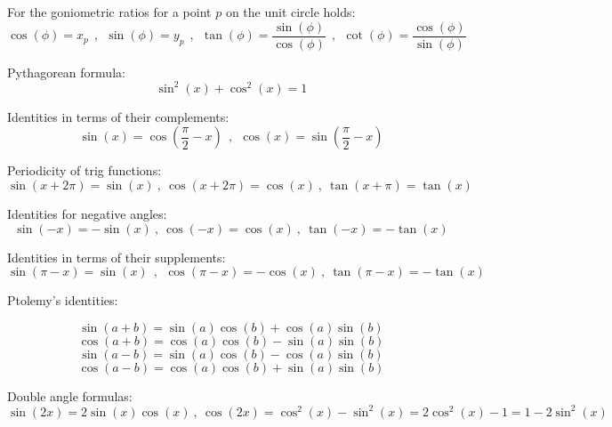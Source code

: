 For the goniometric ratios for a point $p$ on the unit circle holds:
\[
\cos(\phi)=x_p~~,~~\sin(\phi)=y_p~~,~~\tan(\phi)=\frac{\sin(\phi)}{\cos(\phi)}~~,~~\cot(\phi)=\frac{\cos(\phi)}{\sin(\phi)}
\]

Pythagorean formula:
\[
\sin^2(x)+\cos^2(x)=1 
\]

Identities in terms of their complements:
\[
\sin(x)=\cos(\frac{\pi}{2}-x) \ \ , \ \ \cos(x)=\sin(\frac{\pi}{2}-x)
\]

Periodicity of trig functions:
\[
\sin(x+2\pi)=\sin(x) \ , \ \cos(x+2\pi)=\cos(x) \ , \ \tan(x+\pi)=\tan(x)
\]

Identities for negative angles:
\[
\sin(-x) = -\sin(x) \ , \ \cos(-x) = \cos(x) \ , \ \tan(-x) = -\tan(x)
\]

Identities in terms of their supplements:
\[
\sin(\pi-x)=\sin(x) \ \ , \ \ \cos(\pi-x)=-\cos(x) \ , \ \tan(\pi-x) = -\tan(x)
\]

Ptolemy's identities:

\[
\sin(a+b)=\sin(a)\cos(b)+\cos(a)\sin(b)
\]
\[
\cos(a+b)=\cos(a)\cos(b)-\sin(a)\sin(b)
\]
\[
\sin(a-b)=\sin(a)\cos(b)-\cos(a)\sin(b)
\]
\[
\cos(a-b)=\cos(a)\cos(b)+\sin(a)\sin(b)
\]

Double angle formulas:
\[
\sin(2x) = 2\sin(x)\cos(x) \ , \ \cos(2x)=\cos^2(x)-\sin^2(x) = 2\cos^2(x)-1 = 1 - 2\sin^2(x)
\]

